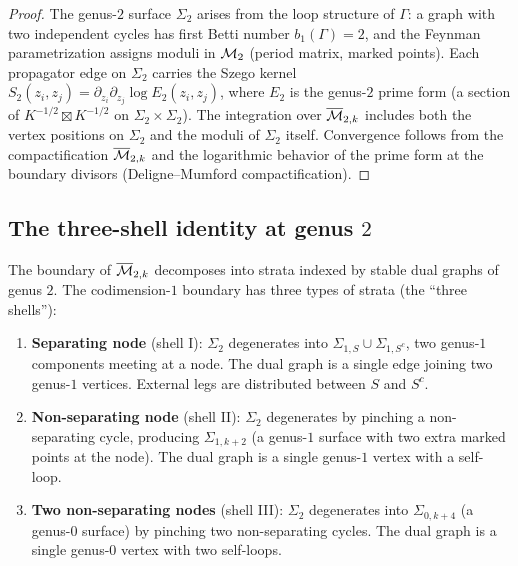 \begin{proof}
The genus-$2$ surface $\Sigma_2$ arises from the loop structure of
$\Gamma$: a graph with two independent cycles has first Betti
number $b_1(\Gamma) = 2$, and the Feynman parametrization assigns
moduli in $\mathcal{M}_2$ (period matrix, marked points). Each propagator
edge on $\Sigma_2$ carries the Szego kernel
$S_2(z_i, z_j) = \partial_{z_i}\partial_{z_j}\log E_2(z_i, z_j)$,
where $E_2$ is the genus-$2$ prime form (a section of
$K^{-1/2} \boxtimes K^{-1/2}$ on $\Sigma_2 \times \Sigma_2$).
The integration over $\overline{\mathcal{M}}_{2,k}$ includes both the
vertex positions on $\Sigma_2$ and the moduli of $\Sigma_2$ itself.
Convergence follows from the compactification
$\overline{\mathcal{M}}_{2,k}$ and the logarithmic behavior of the prime
form at the boundary divisors (Deligne--Mumford compactification).
\end{proof}

\subsection{The three-shell identity at genus $2$}

The boundary of $\overline{\mathcal{M}}_{2,k}$ decomposes into strata
indexed by stable dual graphs of genus $2$. The codimension-$1$
boundary has three types of strata (the ``three shells''):

\begin{definition}
\label{def:thqg-bv-ext-three-shells}
\begin{enumerate}[label=(\roman*)]
\item \textbf{Separating node} (shell I): $\Sigma_2$ degenerates
 into $\Sigma_{1,S} \cup \Sigma_{1,S^c}$, two genus-$1$ components
 meeting at a node. The dual graph is a single edge joining two
 genus-$1$ vertices. External legs are distributed between $S$
 and $S^c$.
\item \textbf{Non-separating node} (shell II): $\Sigma_2$
 degenerates by pinching a non-separating cycle, producing
 $\Sigma_{1,k+2}$ (a genus-$1$ surface with two extra marked
 points at the node). The dual graph is a single genus-$1$
 vertex with a self-loop.
\item \textbf{Two non-separating nodes} (shell III): $\Sigma_2$
 degenerates into $\Sigma_{0,k+4}$ (a genus-$0$ surface) by
 pinching two non-separating cycles. The dual graph is a single
 genus-$0$ vertex with two self-loops.
\end{enumerate}
\end{definition}

